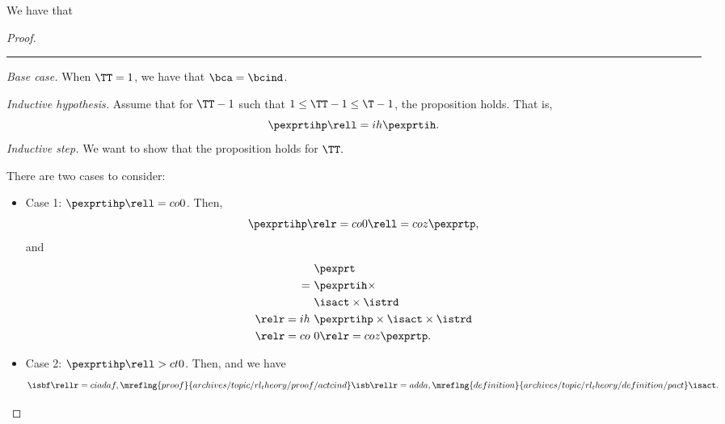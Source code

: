 \begin{proposition}
  We have that %
\end{proposition}

\begin{proof}
  \hrule
  {\it Base case.}
  When $\TT = 1$,
  we have  that
  $\bca = \bcind$.

  \srule
  {\it Inductive hypothesis.}
  Assume that for $\TT - 1$ such that $1 \le \TT - 1 \le \T - 1$,
  the proposition holds. That is,
  $$ \pexprtihp \rell = ih \pexprtih.$$%
  \srule
  {\it Inductive step.}
  We want to show that the proposition holds for $\TT.$

  There are two cases to consider:
  \begin{itemize}
    \item Case 1: $\pexprtihp \rell = co 0$. 
      Then,
      $$\pexprtihp \relr = co 0 \rell = coz \pexprtp,$$
      and
      \begin{align*}
        &\pexprt \\
        =\ &\pexprtih \times \\
        &\isact \times \istrd\\
        \relr = ih \ & \pexprtihp \times \isact \times \istrd \\
        \relr = co \ & 0 \relr = coz \pexprtp.
      \end{align*}
    \item Case 2: $\pexprtihp \rell > ct 0$. 
      Then, 
      and we have
      $$\isbf \rellr = cia daf,\mreflng{proof}{archives/topic/rl_theory/proof/actcind} \isb 
      \rellr = ad da,\mreflng{definition}{archives/topic/rl_theory/definition/pact} \isact.$$


\end{itemize}
\end{proof}
